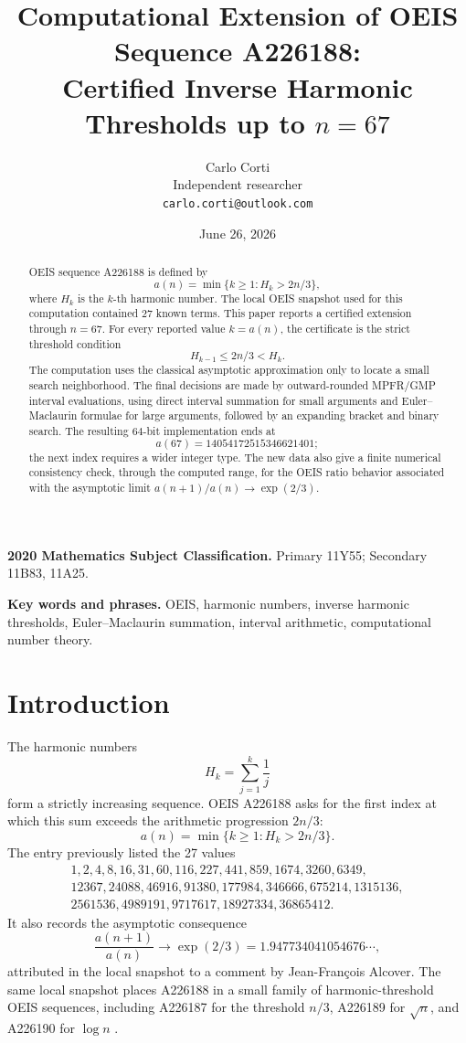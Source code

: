 \documentclass[11pt]{article}
\title{Computational Extension of OEIS Sequence A226188:\\
Certified Inverse Harmonic Thresholds up to \(n=67\)}
\author{Carlo Corti\\
Independent researcher\\
\texttt{carlo.corti@outlook.com}}
\date{June 26, 2026}
\theoremstyle{definition}
\theoremstyle{remark}
\begin{document}
\maketitle

\begin{abstract}
OEIS sequence A226188 is defined by
\[
  a(n)=\min\{k\geq 1: H_k>2n/3\},
\]
where \(H_k\) is the \(k\)-th harmonic number.  The local OEIS snapshot used for
this computation contained 27 known terms.  This paper reports a certified
extension through \(n=67\).  For every reported value \(k=a(n)\), the
certificate is the strict threshold condition
\[
  H_{k-1}\leq 2n/3 < H_k.
\]
The computation uses the classical asymptotic approximation only to locate a
small search neighborhood.  The final decisions are made by outward-rounded
MPFR/GMP interval evaluations, using direct interval summation for small
arguments and Euler--Maclaurin formulae for large arguments, followed by an
expanding bracket and binary search.  The resulting \(64\)-bit implementation
ends at
\[
  a(67)=14054172515346621401;
\]
the next index requires a wider integer type.  The new data also give a
finite numerical consistency check, through the computed range, for the OEIS
ratio behavior associated with the asymptotic limit
\(a(n+1)/a(n)\to \exp(2/3)\).
\end{abstract}

\noindent\textbf{2020 Mathematics Subject Classification.}
Primary 11Y55; Secondary 11B83, 11A25.

\noindent\textbf{Key words and phrases.}
OEIS, harmonic numbers, inverse harmonic thresholds, Euler--Maclaurin summation,
interval arithmetic, computational number theory.

\section{Introduction}

The harmonic numbers
\[
  H_k = \sum_{j=1}^k \frac{1}{j}
\]
form a strictly increasing sequence.  OEIS A226188 asks for the first index at
which this sum exceeds the arithmetic progression \(2n/3\):
\[
  a(n)=\min\{k\geq 1: H_k>2n/3\}.
\]
The entry previously listed the 27 values
\[
\begin{gathered}
1,2,4,8,16,31,60,116,227,441,859,1674,3260,6349,\\
12367,24088,46916,91380,177984,346666,675214,1315136,\\
2561536,4989191,9717617,18927334,36865412.
\end{gathered}
\]
It also records the asymptotic consequence
\[
  \frac{a(n+1)}{a(n)}\to \exp(2/3)=1.947734041054676\cdots,
\]
attributed in the local snapshot to a comment by Jean-François Alcover.
The same local snapshot places A226188 in a small family of harmonic-threshold
OEIS sequences, including A226187 for the threshold \(n/3\), A226189 for
\(\sqrt n\), and A226190 for \(\log n\) \cite{oeisThresholdFamily}.
\end{document}
